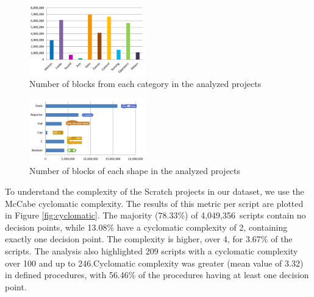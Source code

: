 \documentclass{sig-alternate-05-2015}
\newcommand{\nscripts}{4,049,356}
\begin{document}
\begin{figure}
	\centering
	\includegraphics[width=0.45\textwidth]{fig/charts/16Categories}
	\vspace{-1em}
	\caption{Number of blocks from each category in the analyzed projects}
	\label{fig:categories}
\end{figure}
\begin{figure}
	\centering
	\includegraphics[width=0.45\textwidth]{fig/charts/16Shapes}
	\vspace{-1em}
	\caption{Number of blocks of each shape in the analyzed projects}
	\label{fig:shapes}
\end{figure}

To understand the complexity of the Scratch projects in our dataset, we use the McCabe cyclomatic complexity. The results of this metric per script are plotted in Figure \ref{fig:cyclomatic}. The majority (78.33\%) of \nscripts~scripts contain no decision points, while 13.08\% have a cyclomatic complexity of 2, containing exactly one decision point. The complexity is higher, over 4, for 3.67\% of the scripts. The analysis also highlighted 209 scripts with a cyclomatic complexity over 100 and up to 246.\footnotemark[\ref{repo}] Cyclomatic complexity was greater (mean value of 3.32) in defined procedures, with 56.46\% of the procedures having at least one decision point.

\noindent
{}
\end{document}
